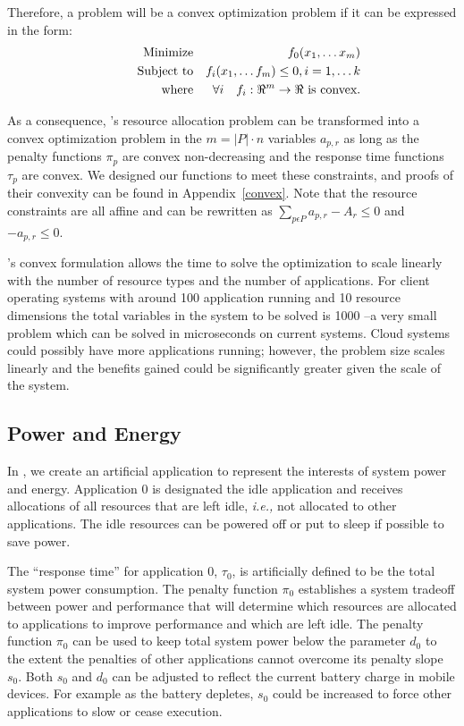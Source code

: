Therefore, a problem will be a convex optimization problem if it can be expressed in the form:
\begin{eqnarray*}
& \makebox[1in][r]{Minimize}   & f_0(x_1,\ldots x_m)                              \\
& \makebox[1in][r]{Subject to} & f_i(x_1,\ldots f_m) \leq 0, i = 1,\ldots k        \\
& \makebox[1in][r]{where}      & \forall i \quad f_i:\Re^m \rightarrow \Re \mbox{ is convex.}
\end{eqnarray*}


As a consequence, \pacora's resource allocation problem can be transformed into a convex optimization problem in the $m = |P|\cdot n$ variables $a_{p,r}$ as long as the penalty functions $\pi_p$ are convex non-decreasing and the response time functions $\tau_p$ are convex.  We designed our functions to meet these constraints, and proofs of their convexity can be found in Appendix~\ref{convex}. Note that the resource constraints are all affine and can be rewritten as
$\sum_{p\epsilon P} a_{p,r} - A_r \leq 0$ and $-a_{p,r} \leq 0$.

\pacora's convex formulation allows the time to solve the optimization to scale linearly with the number of resource types and the number of applications.   For client operating systems with around 100 application running and 10 resource dimensions the total variables in the system to be solved is 1000 --a very small problem which can be solved in microseconds on current systems.   Cloud systems could possibly have more applications running; however, the problem size scales linearly and the benefits gained could be significantly greater given the scale of the system.

\subsection*{Power and Energy}

In \pacora, we create an artificial application to represent the interests of system power and energy.  Application 0 is designated the idle application and receives allocations of all resources
that are left idle, \emph{i.e.,} not allocated to other applications.   The idle resources can be powered off or put to sleep if possible to save power.

The ``response time'' for application 0, $\tau_0$, is artificially defined to be the total system power consumption.
The penalty function $\pi_0$ establishes a system tradeoff between power and performance that
will determine which resources are allocated to applications to improve performance and which are left idle.
The penalty function $\pi_0$ can be used to keep total system power below the parameter $d_0$
to the extent the penalties of other applications cannot overcome its penalty slope $s_0$. Both $s_0$ and $d_0$ can be adjusted to reflect the current battery charge in mobile devices. For example as the battery depletes, $s_0$ could be increased to force other applications to slow or cease execution.

